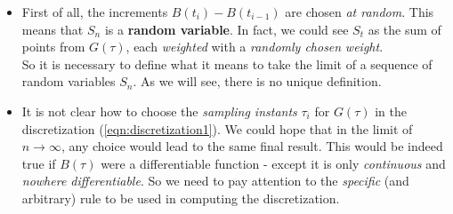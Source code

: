 \documentclass[../template.tex]{subfiles}
\begin{document}
\begin{itemize}
    \item First of all, the increments $B(t_i) - B(t_{i-1})$ are chosen \textit{at random}. This means that $S_n$ is a \textbf{random variable}. In fact,
    we could see $S_t$ as the sum of points from $G(\tau)$, each \textit{weighted} with a \textit{randomly chosen} \textit{weight}.\\   
    So it is necessary to define what it means to take the limit of a sequence of random variables $S_n$. As we will see, there is no unique definition.
    \item It is not clear how to choose the \textit{sampling instants} $\tau_i$ for $G(\tau)$ in the discretization (\ref{eqn:discretization1}). We could hope that in the limit of $n \to\infty$, any choice would lead to the same final result. This would be indeed true if $B(\tau)$ were a differentiable function - except it is only \textit{continuous} and \textit{nowhere differentiable}. So we need to pay attention to the \textit{specific} (and arbitrary) rule to be used in computing the discretization. 
\end{itemize}
\end{document}
